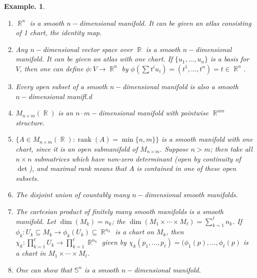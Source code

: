 \documentclass[11pt, a4paper]{memoir}
\DeclareMathOperator{\R}{{\mathbb{R}}}
\theoremstyle{change}
\theoremstyle{plain}
\theoremstyle{nonumberplain}
\newtheorem{example}{Example.}
\DeclareMathOperator{\rank}{rank}
\numberwithin{equation}{section}
\begin{document}
\begin{example}
    \begin{enumerate}[nl]
        \item $\R^n$ is a smooth $n-$dimensional manifold.
            It can be given an atlas consisting of 1 chart, the identity map.
        \item Any $n-$dimensional vector space over $\R$ is a smooth $n-$dimensional manifold.
            It can be given an atlas with one chart.
            If $\{u_1,\ldots,u_n\}$ is a basis for $V$, then one can define $\phi:V\to\R^n$ by $\phi(\sum t^iu_i)=(t^1,\ldots,t^n)=t\in\R^n$.
        \item Every open subset of a smooth $n-$dimensional manifold is also a smooth $n-$dimensional manifl.d
        \item $M_{n\times m}(\R)$ is an $n\cdot m-$dimensional manifold with pointwise $\R^{nm}$ structure.
        \item $\{A\in M_{n\times m}(\R):\rank(A)=\min\{n,m\}\}$ is a smooth manifold with one chart, since it is an open submanifold of $M_{n\times m}$.
            Suppose $n>m$; then take all $n\times n$ submatrices which have non-zero determinant (open by continuity of $\det$), and maximal rank means that $A$ is contained in one of these open subsets.
        \item The disjoint union of countably many $n-$dimensional smooth manifolds.
        \item The cartesian product of finitely many smooth manifolds is a smooth manifold.
            Let $\dim(M_k)=n_k$; the  $\dim(M_1\times\cdots\times M_\ell)=\sum_{k=1}^\ell n_k$.
            If $\phi_k:U_k\subseteq M_k\to\phi_k(U_k)\subseteq\R^{n_k}$ is a chart on $M_k$, then $\chi_k:\prod_{k=1}^\ell U_k\to\prod_{k=1}^\ell\R^{n_k}$ given by $\chi_k(p_1,\ldots,p_\ell)=(\phi_1(p),\ldots,\phi_\ell(p)$ is a chart in $M_1\times\cdots\times M_\ell$.
        \item One can show that $\mathbb{S}^n$ is a smooth $n-$dimensional manifold.
    \end{enumerate}
\end{example}
\end{document}

